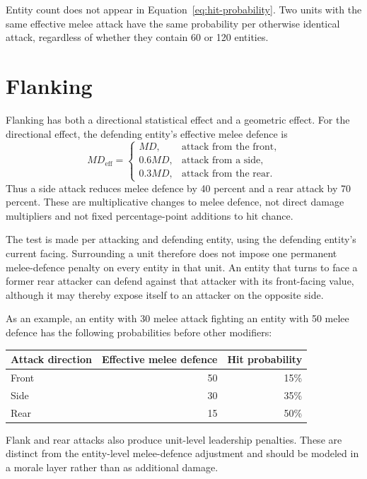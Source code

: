 \documentclass[11pt]{article}
\begin{document}
Entity count does not appear in Equation~\ref{eq:hit-probability}.  Two units
with the same effective melee attack have the same probability per otherwise
identical attack, regardless of whether they contain 60 or 120 entities.

\section{Flanking}

Flanking has both a directional statistical effect and a geometric effect.
For the directional effect, the defending entity's effective melee defence is
\begin{equation}
  MD_{\mathrm{eff}} =
  \begin{cases}
    MD,     & \text{attack from the front},\\
    0.6 MD, & \text{attack from a side},\\
    0.3 MD, & \text{attack from the rear}.
  \end{cases}
  \label{eq:directional-md}
\end{equation}
Thus a side attack reduces melee defence by 40 percent and a rear attack by
70 percent.  These are multiplicative changes to melee defence, not direct
damage multipliers and not fixed percentage-point additions to hit chance.

The test is made per attacking and defending entity, using the defending
entity's current facing.  Surrounding a unit therefore does not impose one
permanent melee-defence penalty on every entity in that unit.  An entity that
turns to face a former rear attacker can defend against that attacker with its
front-facing value, although it may thereby expose itself to an attacker on
the opposite side.

As an example, an entity with 30 melee attack fighting an entity with 50 melee
defence has the following probabilities before other modifiers:
\begin{center}
  \begin{tabular}{lrr}
    \toprule
    Attack direction & Effective melee defence & Hit probability \\
    \midrule
    Front & 50 & 15\% \\
    Side  & 30 & 35\% \\
    Rear  & 15 & 50\% \\
    \bottomrule
  \end{tabular}
\end{center}

Flank and rear attacks also produce unit-level leadership penalties.  These
are distinct from the entity-level melee-defence adjustment and should be
modeled in a morale layer rather than as additional damage.
\end{document}
